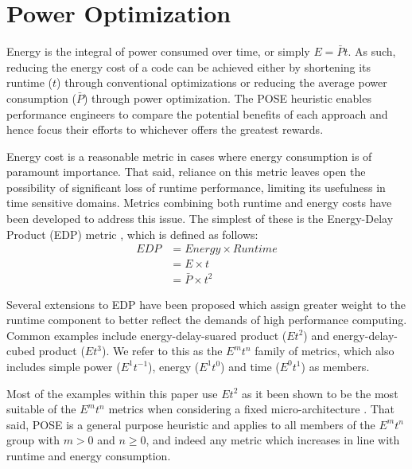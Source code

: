 \section{Power Optimization}
\label{sec:optimization}

Energy is the integral of power consumed over time, or simply $E = \bar{P}t$.
As such, reducing the energy cost of a code can be achieved either by shortening its runtime ($t$) through conventional optimizations or reducing the average power consumption ($\bar{P}$) through power optimization.
The POSE heuristic enables performance engineers to compare the potential benefits of each approach and hence focus their efforts to whichever offers the greatest rewards.

Energy cost is a reasonable metric in cases where energy consumption is of paramount importance.
That said, reliance on this metric leaves open the possibility of significant loss of runtime performance, limiting its usefulness in time sensitive domains.
Metrics combining both runtime and energy costs have been developed to address this issue. 
The simplest of these is the Energy-Delay Product (EDP) metric \cite{gonzales:1995aa}, which is defined as follows:
\begin{align}
  EDP &= Energy \times Runtime \nonumber \\
      &= E \times t \nonumber \\
      &= \bar{P} \times t^2
  \label{eq:edp}
\end{align}

Several extensions to EDP have been proposed which assign greater weight to the runtime component to better reflect the demands of high performance computing.
Common examples include energy-delay-suared product ($Et^{2}$) and energy-delay-cubed product ($Et^{3}$).
We refer to this as the $E^mt^n$ family of metrics, which also includes simple power ($E^1t^{-1}$), energy ($E^1t^0$) and time ($E^0t^1$) as members.

Most of the examples within this paper use $Et^2$ as it been shown to be the most suitable of the $E^mt^n$ metrics when considering a fixed micro-architecture \cite{brooks:2000aa}.
That said, POSE is a general purpose heuristic and applies to all members of the $E^mt^n$ group with $m > 0$ and $n \geq 0$, and indeed any metric which increases in line with runtime and energy consumption.
